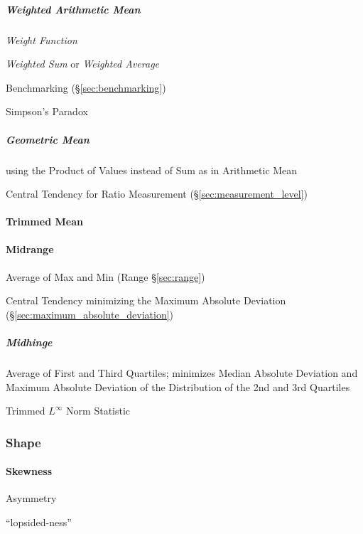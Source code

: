 \subparagraph{Weighted Arithmetic Mean}\label{sec:weighted_mean}\hfill

\emph{Weight Function}

\emph{Weighted Sum} or \emph{Weighted Average}

\fist Benchmarking (\S\ref{sec:benchmarking})

Simpson's Paradox



\subparagraph{Geometric Mean}\label{sec:geometric_mean}\hfill

using the Product of Values instead of Sum as in Arithmetic Mean

Central Tendency for Ratio Measurement (\S\ref{sec:measurement_level})



\paragraph{Trimmed Mean}\label{sec:trimmed_mean}\hfill



\paragraph{Midrange}\label{sec:midrange}\hfill

Average of Max and Min (Range \S\ref{sec:range})

Central Tendency minimizing the Maximum Absolute Deviation
(\S\ref{sec:maximum_absolute_deviation})



\subparagraph{Midhinge}\label{sec:midhinge}\hfill

Average of First and Third Quartiles; minimizes Median Absolute Deviation and
Maximum Absolute Deviation of the Distribution of the 2nd and 3rd Quartiles

Trimmed $L^\infty$ Norm Statistic



\subsubsection{Shape}\label{sec:distribution_shape}

\paragraph{Skewness}\label{sec:skewness}\hfill

Asymmetry %

``lopsided-ness''

